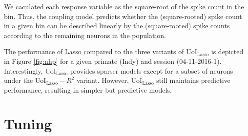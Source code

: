 \documentclass[11pt]{article}
\begin{document}
We caculated each response variable as the square-root of the spike count in the bin. Thus, the coupling model predicts whether the (square-rooted) spike count in a given bin can be described linearly by the (square-rooted) spike counts according to the remaining neurons in the population. 

The performance of Lasso compared to the three variants of UoI$_{\text{Lasso}}$ is depicted in Figure \ref{fig:nhp} for a given primate (Indy) and session (04-11-2016-1). Interestingly, UoI$_{\text{Lasso}}$ provides sparser models except for a subset of neurons under the UoI$_{\text{Lasso}}-R^2$ variant. However, UoI$_{\text{Lasso}}$ still maintains predictive performance, resulting in simpler but predictive models.


\newpage

\section{Tuning}
\end{document}
